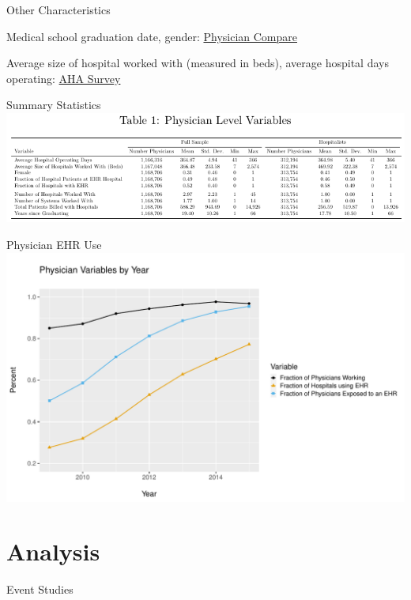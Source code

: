 \documentclass[10pt]{beamer}
\begin{document}
\begin{frame}{Other Characteristics}

Medical school graduation date, gender: \underline{Physician Compare}

\vspace{5mm}

Average size of hospital worked with (measured in beds), average hospital days operating: \underline{AHA Survey}
\end{frame}

\begin{frame}{Summary Statistics}
\centering
    \includegraphics[scale=.8]{Objects/sumstats.pdf}
\end{frame}

\begin{frame}{Physician EHR Use}
    \centering
    \includegraphics[scale=.5]{Objects/sum_stats_year.pdf}
\end{frame}


\section{Analysis}

\begin{frame}{Event Studies}


    
\end{frame}
\end{document}
